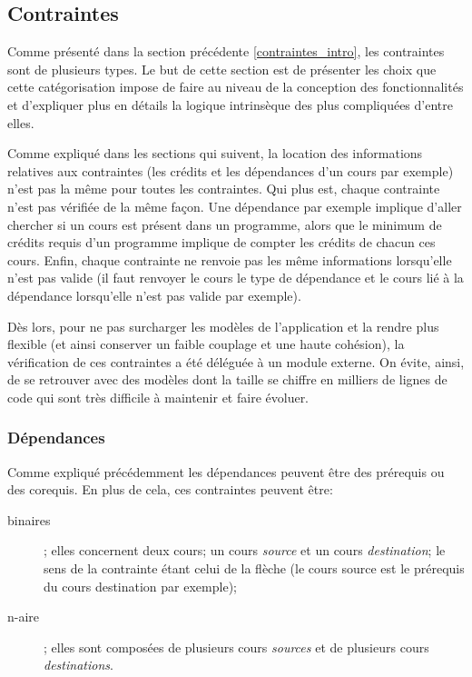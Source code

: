 \subsection{Contraintes}
\label{contraintes}
Comme présenté dans la section précédente \ref{contraintes_intro}, les contraintes sont de plusieurs types. Le but de cette section est de présenter les choix que cette catégorisation impose de faire au niveau de la conception des fonctionnalités et d'expliquer plus en détails la logique intrinsèque des plus compliquées d'entre elles.    

Comme expliqué dans les sections qui suivent, la location des informations relatives aux contraintes (les crédits et les dépendances d'un cours par exemple) n'est pas la même pour toutes les contraintes. Qui plus est, chaque contrainte n'est pas vérifiée de la même façon. Une dépendance par exemple implique d'aller chercher si un cours est présent dans un programme, alors que le minimum de crédits requis d'un programme implique de compter les crédits de chacun ces cours. Enfin, chaque contrainte ne renvoie pas les même informations lorsqu'elle n'est pas valide (il faut renvoyer le cours le type de dépendance et le cours lié à la dépendance lorsqu'elle n'est pas valide par exemple). 

 
Dès lors, pour ne pas surcharger les modèles de l'application et la rendre plus flexible (et ainsi conserver un faible couplage et une haute cohésion), la vérification de ces contraintes a été déléguée à un module externe. On évite, ainsi, de se retrouver avec des modèles dont la taille se chiffre en milliers de lignes de code qui sont très difficile à maintenir et faire évoluer. 
\subsubsection{Dépendances}
\label{dependances}
Comme expliqué précédemment les dépendances peuvent être des prérequis ou des corequis. En plus de cela, ces contraintes peuvent être:
\begin{description}
\item[binaires]; elles concernent deux cours; un cours \textit{source} et un cours \textit{destination}; le sens de la contrainte étant celui de la flèche (le cours source est le prérequis du cours destination par exemple);
\item[n-aire]; elles sont composées de plusieurs cours \textit{sources} et de plusieurs cours \textit{destinations}.
\end{description}
 
